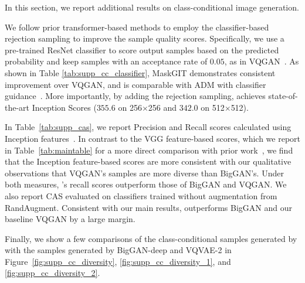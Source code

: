 

\label{sec:supp_diversity_comparison}
 
In this section, we report additional results on class-conditional image generation.

We follow prior transformer-based methods\cite{Razavi19vqvae2,Esser21vqgan} to employ the classifier-based rejection sampling to improve the sample quality scores. Specifically, we use a pre-trained ResNet classifier\cite{ResNet} to score output samples based on the predicted probability and keep samples with an acceptance rate of $0.05$, as in VQGAN~\cite{Esser21vqgan}. 
As shown in Table \ref{tab:supp_cc_classifier}, MaskGIT demonstrates consistent improvement over VQGAN, and is comparable with ADM with classifier guidance~\cite{dhariwal2021diffusion}. More importantly, by adding the rejection sampling, \model achieves state-of-the-art Inception Scores ($355.6$ on 256$\times$256 and $342.0$ on 512$\times$512). 



In Table~\ref{tab:supp_cas}, we report Precision and Recall scores calculated using Inception features~\cite{christian16inception}. In contrast to the VGG\cite{simonyan2015vgg} feature-based scores, which we report in Table~\ref{tab:maintable} for a more direct comparison with prior work~\cite{KynkaanniemiKLL19,dhariwal2021diffusion}, we find that the Inception feature-based scores are more consistent with our qualitative observations that VQGAN’s samples are more diverse than BigGAN’s. Under both measures, \model’s recall scores outperform those of BigGAN and VQGAN. We also report CAS evaluated on classifiers trained without augmentation from RandAugment\cite{cubuk2019randaugment}. Consistent with our main results, \model outperforms BigGAN and our baseline VQGAN by a large margin.

Finally, we show a few comparisons of the class-conditional samples generated by \model with the samples generated by BigGAN-deep and VQVAE-2 in Figure~\ref{fig:supp_cc_diversity}, \ref{fig:supp_cc_diversity_1}, and \ref{fig:supp_cc_diversity_2}.





\label{sec:supp_image_editing}




